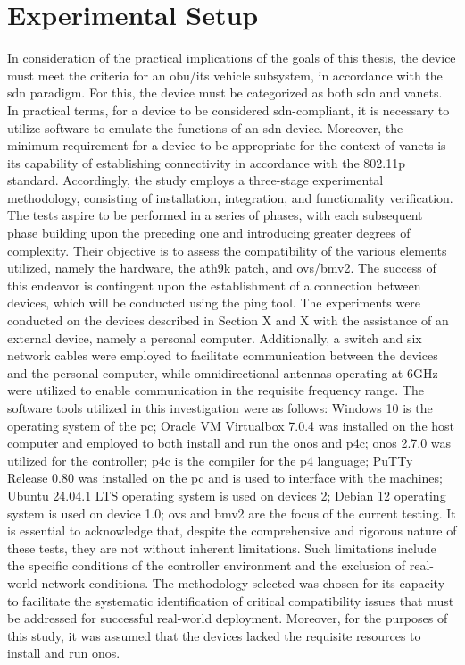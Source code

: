 \section{Experimental Setup}
In consideration of the practical implications of the goals of this thesis, the device must meet the criteria for an \gls{obu}/\gls{its} vehicle subsystem, in accordance with the \gls{sdn} paradigm. For this, the device must be categorized as both \gls{sdn} and \glspl{vanet}. In practical terms, for a device to be considered \gls{sdn}-compliant, it is necessary to utilize software to emulate the functions of an \gls{sdn} device. Moreover, the minimum requirement for a device to be appropriate for the context of \glspl{vanet} is its capability of establishing connectivity in accordance with the 802.11p standard.
Accordingly, the study employs a three-stage experimental methodology, consisting of installation, integration, and functionality verification. The tests aspire to be performed in a series of phases, with each subsequent phase building upon the preceding one and introducing greater degrees of complexity. Their objective is to assess the compatibility of the various elements utilized, namely the hardware, the ath9k patch, and \gls{ovs}/\gls{bmv2}. The success of this endeavor is contingent upon the establishment of a connection between devices, which will be conducted using the ping tool.
The experiments were conducted on the devices described in Section X and X with the assistance of an external device, namely a personal computer. Additionally, a switch and six network cables were employed to facilitate communication between the devices and the personal computer, while omnidirectional antennas operating at 6GHz were utilized to enable communication in the requisite frequency range.
The software tools utilized in this investigation were as follows:
Windows 10 is the operating system of the \gls{pc};
Oracle VM Virtualbox 7.0.4 was installed on the host computer and employed to both install and run the \gls{onos} and p4c;
\gls{onos} 2.7.0 was utilized for the controller;
p4c is the compiler for the \gls{p4} language;
PuTTy Release 0.80 was installed on the \gls{pc} and is used to interface with the machines;
Ubuntu 24.04.1 LTS operating system is used on devices 2;
Debian 12 operating system is used on device 1.0;
\gls{ovs} and \gls{bmv2} are the focus of the current testing.
It is essential to acknowledge that, despite the comprehensive and rigorous nature of these tests, they are not without inherent limitations. Such limitations include the specific conditions of the controller environment and the exclusion of real-world network conditions. The methodology selected was chosen for its capacity to facilitate the systematic identification of critical compatibility issues that must be addressed for successful real-world deployment. Moreover, for the purposes of this study, it was assumed that the devices lacked the requisite resources to install and run \gls{onos}.


